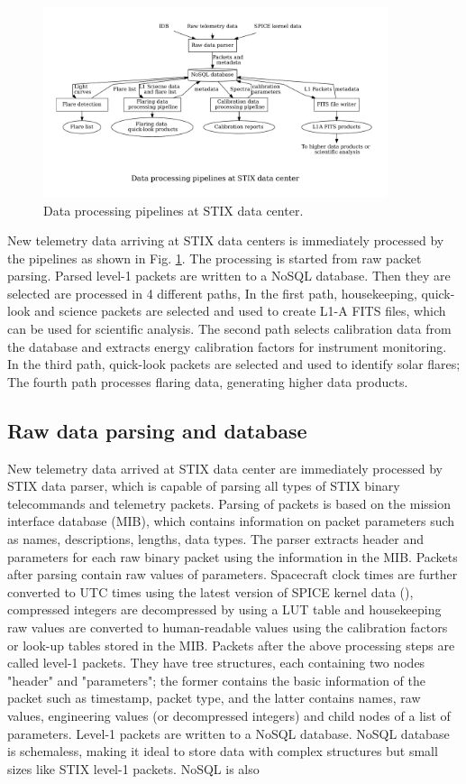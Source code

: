 \documentclass[referee]{aa} %
\begin{document}
\begin{figure}
    \centering
    \includegraphics[width=0.9\textwidth]{figures/pipelines.pdf}
    \caption{Data processing pipelines at STIX data center.}
    \label{fig:main_pipelines}
\end{figure}
New telemetry data arriving at STIX data centers is immediately processed by the pipelines as shown 
in Fig. \ref{fig:main_pipelines}. 
The processing is started from raw packet parsing. Parsed level-1 packets are written to a NoSQL database. 
Then they are selected  are processed in 4 different paths, 
In the first path,  housekeeping, quick-look and science packets 
are selected and used to create L1-A FITS files, 
which can be used for scientific analysis. 
The second path selects calibration data from the database and extracts energy calibration factors for 
instrument monitoring. In the third path, quick-look packets are selected and used to identify solar
flares; The fourth path processes flaring data, 
generating higher data products.   

\subsection{Raw data parsing and database}
New telemetry data arrived at STIX data center are immediately processed by STIX data parser, 
which is capable of parsing all types of STIX binary telecommands and telemetry packets.   
Parsing of packets is based on the mission interface database (MIB), which 
contains information on packet parameters such as names, descriptions, lengths,
data types. The parser extracts header and parameters for each raw binary packet
using the information in the MIB.
Packets after parsing contain raw values of parameters. 
 Spacecraft clock times are further converted to UTC times using 
the latest version of SPICE kernel data (\cite{spice1996,spice2018}), compressed integers are  
decompressed by using a LUT table and 
housekeeping raw values are converted to 
human-readable values using the calibration factors or look-up tables stored in the MIB. 
Packets after the above processing steps are called level-1 packets. They
have tree structures, each containing two nodes "header" and "parameters";
the former contains the basic information  of the packet such as timestamp, packet type,
and the latter contains names, 
raw values, engineering values (or decompressed integers) and child nodes of a list of parameters.
Level-1 packets are written 
to a NoSQL database. 
NoSQL database is schemaless,  making it ideal to store data with complex
structures but small sizes like STIX level-1 packets.  
NoSQL is also 
\end{document}
